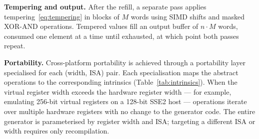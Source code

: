 \documentclass[preprint,1p,times]{elsarticle}
\begin{document}
\textbf{Tempering and output.}
After the refill, a separate pass applies tempering~\eqref{eq:tempering} in blocks of $M$ words using SIMD shifts and masked XOR-AND operations. Tempered values fill an output buffer of $n \cdot M$ words, consumed one element at a time until exhausted, at which point both passes repeat.

\textbf{Portability.}
Cross-platform portability is achieved through a portability layer specialised for each (width, ISA) pair. Each specialisation maps the abstract operations to the corresponding intrinsics (Table~\ref{tab:intrinsics}). When the virtual register width exceeds the hardware register width --- for example, emulating 256-bit virtual registers on a 128-bit SSE2 host --- operations iterate over multiple hardware registers with no change to the generator code. The entire generator is parameterised by register width and ISA; targeting a different ISA or width requires only recompilation.
\end{document}
